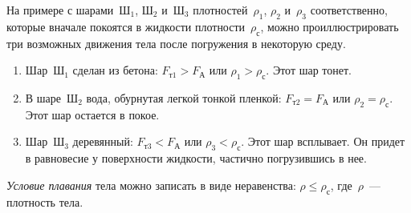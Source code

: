 \documentclass[main.tex]{subfiles}
\begin{document}
На примере с шарами~Ш$_1$, Ш$_2$ и~Ш$_3$  плотностей~$\rho_1$, $\rho_2$ и~$\rho_3$ соответственно, которые вначале покоятся в жидкости плотности~$\rho_\text{с}$, можно проиллюстрировать три возможных движения тела после погружения в некоторую среду.

\begin{enumerate}
    \item Шар~Ш$_1$ сделан из бетона: $F_\text{т1}>F_\text{А}$ или $\rho_1>\rho_\text{с}$. Этот шар тонет.
    \item В шаре~Ш$_2$ вода, обурнутая легкой тонкой пленкой: $F_\text{т2}=F_\text{А}$ или $\rho_2=\rho_\text{с}$. Этот шар остается в покое.
    \item Шар~Ш$_3$ деревянный: $F_\text{т3}<F_\text{А}$ или $\rho_3<\rho_\text{с}$. Этот шар всплывает. Он придет в равновесие у поверхности жидкости, частично погрузившись в нее.
\end{enumerate}


\emph{Условие плавания} тела можно записать в виде неравенства: $\rho \leqslant \rho_\text{с}$, где~$\rho$~--- плотность тела.








 
\end{document}
